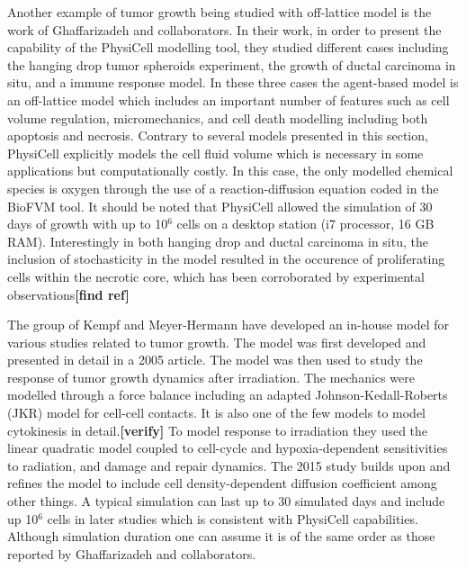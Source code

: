 \documentclass[11pt,a4paper]{article}
\begin{document}
Another example of tumor growth being studied with off-lattice model is the work of Ghaffarizadeh and collaborators.\cite{Ghaffarizadeh2017} In their work, in order to present the capability of the PhysiCell modelling tool, they studied different cases including the hanging drop tumor spheroids experiment, the growth of ductal carcinoma in situ, and a immune response model. In these three cases the agent-based model is an off-lattice model which includes an important number of features such as cell volume regulation, micromechanics, and cell death modelling including both apoptosis and necrosis. Contrary to several models presented in this section, PhysiCell explicitly models the cell fluid volume which is necessary in some applications but computationally costly. In this case, the only modelled chemical species is oxygen through the use of a reaction-diffusion equation coded in the BioFVM tool. It should be noted that PhysiCell allowed the simulation of 30 days of growth with up to 10$^6$ cells on a desktop station (i7 processor, 16 GB RAM). Interestingly in both hanging drop and ductal carcinoma in situ, the inclusion of stochasticity in the model resulted in the occurence of proliferating cells within the necrotic core, which has been corroborated by experimental observations\textbf{[find ref]}

The group of Kempf and Meyer-Hermann have developed an in-house model for various studies related to tumor growth. The model was first developed and presented in detail in a 2005 article. \cite{Kempf2005} The model was then used to study the response of tumor growth dynamics after irradiation.\cite{Kempf2010} The mechanics were modelled through a force balance including  an adapted Johnson-Kedall-Roberts (JKR) model for cell-cell contacts. It is also one of the few models to model cytokinesis in detail.\textbf{[verify]} To model response to irradiation they used the linear quadratic model coupled to cell-cycle and hypoxia-dependent sensitivities to radiation, and damage and repair dynamics. The 2015 study builds upon and refines the model to include cell density-dependent diffusion coefficient among other things. A typical simulation can last up to  30 simulated days and include up 10$^6$ cells in later studies which is consistent with PhysiCell capabilities. Although simulation duration one can assume it is of the same order as those reported by Ghaffarizadeh and collaborators.
\end{document}
